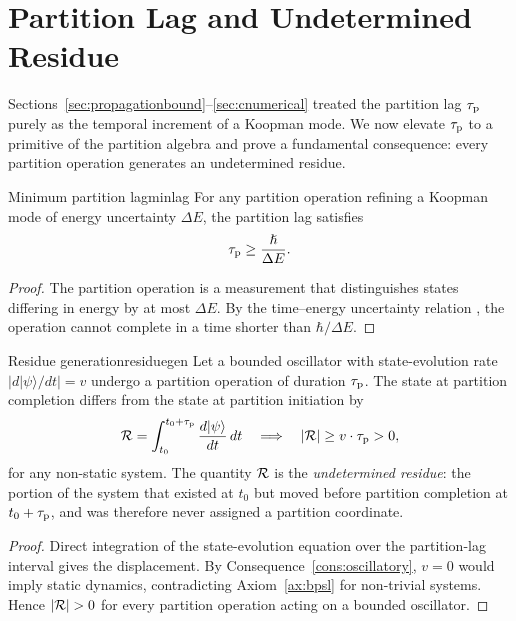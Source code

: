 \section{Partition Lag and Undetermined Residue}
\label{sec:partitionlag}

Sections~\ref{sec:propagationbound}--\ref{sec:cnumerical} treated the partition lag $\tau_{\mathrm{p}}$ purely as the temporal increment of a Koopman mode. We now elevate $\tau_{\mathrm{p}}$ to a primitive of the partition algebra and prove a fundamental consequence: every partition operation generates an undetermined residue.

\begin{consequence}{Minimum partition lag}{minlag}
For any partition operation refining a Koopman mode of energy uncertainty $\Delta E$, the partition lag satisfies
\begin{equation}
\tau_{\mathrm{p}} \geq \frac{\hslash}{\Delta E}.
\end{equation}
\end{consequence}

\begin{proof}
The partition operation is a measurement that distinguishes states differing in energy by at most $\Delta E$. By the time--energy uncertainty relation \citep{landaulifshitz1}, the operation cannot complete in a time shorter than $\hbar/\Delta E$.
\end{proof}

\begin{consequence}{Residue generation}{residuegen}
Let a bounded oscillator with state-evolution rate $|d|\psi\rangle/dt|=v$ undergo a partition operation of duration $\tau_{\mathrm{p}}$. The state at partition completion differs from the state at partition initiation by
\begin{equation}
\mathcal{R}=\int_{t_0}^{t_0+\tau_{\mathrm{p}}}\frac{d|\psi\rangle}{dt}\,dt\quad\Longrightarrow\quad |\mathcal{R}|\geq v\cdot\tau_{\mathrm{p}}>0,
\end{equation}
for any non-static system. The quantity $\mathcal{R}$ is the \emph{undetermined residue}: the portion of the system that existed at $t_0$ but moved before partition completion at $t_0+\tau_{\mathrm{p}}$, and was therefore never assigned a partition coordinate.
\end{consequence}

\begin{proof}
Direct integration of the state-evolution equation over the partition-lag interval gives the displacement. By Consequence~\ref{cons:oscillatory}, $v=0$ would imply static dynamics, contradicting Axiom~\ref{ax:bpsl} for non-trivial systems. Hence $|\Residue|>0$ for every partition operation acting on a bounded oscillator.
\end{proof}

